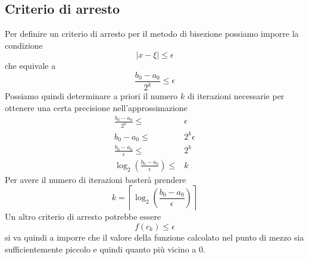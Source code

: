 \subsection{Criterio di arresto}
Per definire un criterio di arresto per il metodo di bisezione possiamo imporre la condizione
\[ |x - \xi| \leq \epsilon \]
che equivale a
\[ \frac{b_0 - a_0}{2^k} \leq \epsilon \]
Possiamo quindi determinare a priori il numero $k$ di iterazioni necessarie per ottenere una certa precisione
nell'approssimazione
\begin{align*}
	\frac{b_0 - a_0}{2^k} \leq                            & \epsilon     \\
	b_0 - a_0 \leq                                        & 2^k \epsilon \\
	\frac{b_0 - a_0}{\epsilon} \leq                       & 2^k          \\
	\log_2 \left( \frac{b_0 - a_0}{\epsilon} \right) \leq & k
\end{align*}
Per avere il numero di iterazioni basterà prendere
\[ k = \left\lceil \log_2 \left( \frac{b_0 - a_0}{\epsilon} \right) \right\rceil \]
Un altro criterio di arresto potrebbe essere
\[ f(c_k) \leq \epsilon \]
si va quindi a imporre che il valore della funzione calcolato nel punto di mezzo sia sufficientemente piccolo
e quindi quanto più vicino a 0.